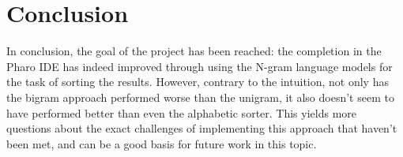 \chapter{Conclusion}
\label{chap:Conclusion}
In conclusion, the goal of the project has been reached: the completion in the Pharo IDE has indeed improved through using the N-gram language models for the task of sorting the results. However, contrary to the intuition, not only has the bigram approach performed worse than the unigram, it also doesn't seem to have performed better than even the alphabetic sorter. This yields more questions about the exact challenges of implementing this approach that haven't been met, and can be a good basis for future work in this topic.